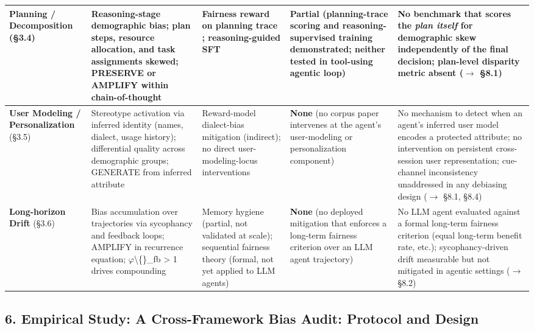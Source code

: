 \documentclass[10pt]{article}
\begin{document}
\begin{center}
\begin{longtable}{|p{}|p{}|p{}|p{}|p{}|}
\textbf{Planning / Decomposition} (\S{}3.4) & Reasoning-stage demographic bias; plan steps, resource allocation, and task assignments skewed; PRESERVE or AMPLIFY within chain-of-thought \cite{li2025actions,parziale2026once,wu2025reasoning} & Fairness reward on planning trace \cite{hall2025guiding}; reasoning-guided SFT \cite{kabra2025reasoning} & \textbf{Partial} (planning-trace scoring and reasoning-supervised training demonstrated; neither tested in tool-using agentic loop) & No benchmark that scores the \emph{plan itself} for demographic skew independently of the final decision; plan-level disparity metric absent ($\rightarrow$ \S{}8.1) \\ \hline
\textbf{User Modeling / Personalization} (\S{}3.5) & Stereotype activation via inferred identity (names, dialect, usage history); differential quality across demographic groups; GENERATE from inferred attribute \cite{kantharuban2024stereotype,pawar2025presumed,mire2025rejected} & Reward-model dialect-bias mitigation \cite{mire2025rejected} (indirect); no direct user-modeling-locus interventions & \textbf{None} (no corpus paper intervenes at the agent's user-modeling or personalization component) & No mechanism to detect when an agent's inferred user model encodes a protected attribute; no intervention on persistent cross-session user representation; cue-channel inconsistency \cite{tonneau2026different} unaddressed in any debiasing design ($\rightarrow$ \S{}8.1, \S{}8.4) \\ \hline
\textbf{Long-horizon Drift} (\S{}3.6) & Bias accumulation over trajectories via sycophancy and feedback loops; AMPLIFY in recurrence equation; $\varphi$\textbackslash\{\}\_fb > 1 drives compounding \cite{ma2026implicit,wyllie2024fairness,liu2025truth} & Memory hygiene \cite{ma2026implicit} (partial, not validated at scale); sequential fairness theory \cite{xu2024adapting,hu2022achieving} (formal, not yet applied to LLM agents) & \textbf{None} (no deployed mitigation that enforces a long-term fairness criterion over an LLM agent trajectory) & No LLM agent evaluated against a formal long-term fairness criterion (equal long-term benefit rate, etc.); sycophancy-driven drift measurable \cite{hong2025measuring} but not mitigated in agentic settings ($\rightarrow$ \S{}8.2) \\ \hline
\end{longtable}\end{center}



\subsection*{6. Empirical Study: A Cross-Framework Bias Audit: Protocol and Design}
\end{document}
